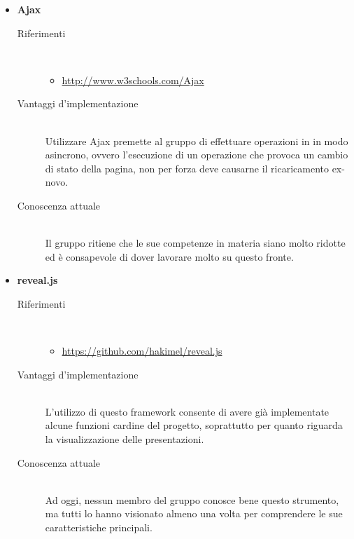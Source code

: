 \begin{itemize}
\begin{description}
	\end{description}
	\item \textbf{Ajax}
	\begin{description}
		\item[Riferimenti] \hfill \\
		\begin{itemize}
			\item \url{http://www.w3schools.com/Ajax}
		\end{itemize}
		\item[Vantaggi d'implementazione] \hfill \\ Utilizzare Ajax premette al gruppo di effettuare operazioni in in modo asincrono, ovvero l’esecuzione di un operazione che provoca un cambio di stato della pagina, non per forza deve causarne il ricaricamento ex-novo.
		\item[Conoscenza attuale]\hfill \\  Il gruppo ritiene che le sue competenze in materia siano molto ridotte ed è consapevole di dover lavorare molto su questo fronte.
	\end{description}
	\item \textbf{reveal.js}
	\begin{description}
		\item[Riferimenti] \hfill \\
		\begin{itemize}
			\item \url{https://github.com/hakimel/reveal.js}
		\end{itemize}
		\item[Vantaggi d'implementazione] \hfill \\ L’utilizzo di questo framework consente di avere già implementate alcune funzioni cardine del progetto, soprattutto per quanto riguarda la visualizzazione delle presentazioni.
		\item[Conoscenza attuale] \hfill \\  Ad oggi, nessun membro del gruppo conosce bene questo strumento, ma tutti lo hanno visionato almeno una volta per comprendere le sue caratteristiche principali.
	\end{description}
\end{itemize}
